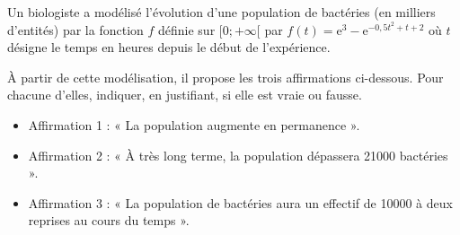 Un biologiste a modélisé l'évolution d'une population de bactéries (en milliers d'entités) par la fonction $f$ définie sur $[0;+\infty[$ par $f(t) = \text{e}^3 -  \text{e}^{-0,5t^2+t+2}$ où $t$ désigne le temps en heures depuis le début de l'expérience.

\smallskip

À partir de cette modélisation, il propose les trois affirmations ci-dessous. Pour chacune d'elles, indiquer, en justifiant, si elle est vraie ou fausse.

\begin{itemize}
	\item Affirmation 1 : « La population augmente en permanence ».
	\item Affirmation 2 : « À très long terme, la population dépassera \num{21000} bactéries ».
	\item Affirmation 3 : « La population de bactéries aura un effectif de \num{10000} à deux reprises au cours du temps ».
\end{itemize}